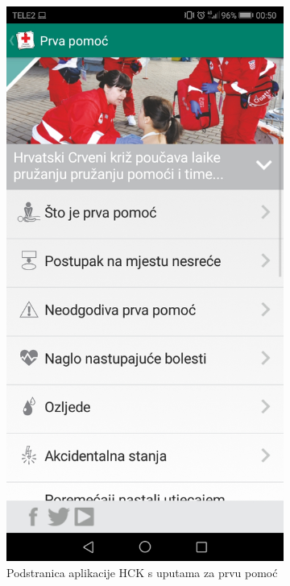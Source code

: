 {\begin{figure}[h!]
\begin{subfigure}[b]{0.3\linewidth}
					\centering
					\includegraphics[scale=0.1]{./slike/crv2.jpg}
					\caption{\tiny Podstranica aplikacije HCK s uputama za prvu pomoć}
					\label{fig:sub-second}
				\end{subfigure}
				\begin{subfigure}[b]{0.3\linewidth}

\end{subfigure}
\end{figure}}
